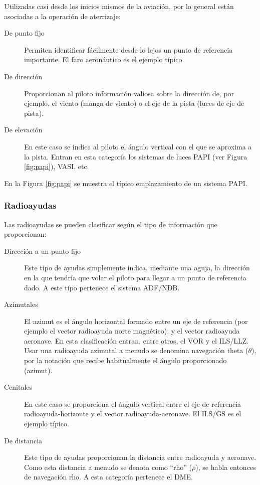 Utilizadas casi desde los inicios mismos de la aviaci\'on, por lo general est\'an asociadas a la operaci\'on de aterrizaje:
\begin{description}
\item [De punto fijo] Permiten identificar f\'acilmente desde lo lejos un punto de referencia importante. El faro aeron\'autico es el ejemplo t\'ipico.

    \item [De direcci\'on] Proporcionan al piloto informaci\'on valiosa sobre la direcci\'on de, por ejemplo, el viento (manga de viento) o el eje de la pista (luces de eje de pista).

    \item [De elevaci\'on] En este caso se indica al piloto el \'angulo vertical con el que se aproxima a la pista. Entran en esta categor\'ia los sistemas de luces PAPI (ver Figura \ref{fig:papi}), VASI, etc.

\end{description}
     

En la Figura \ref{fig:papi} se muestra el t\'ipico emplazamiento de un sistema PAPI. 



\subsubsection{Radioayudas}

Las radioayudas se pueden clasificar seg\'un el tipo de informaci\'on que proporcionan:

\begin{description}
\item [Direcci\'on a un punto fijo] Este tipo de ayudas simplemente indica, mediante una aguja, la direcci\'on en la que tendr\'ia que volar el piloto para llegar a un punto de referencia dado. A este tipo pertenece el sistema ADF/NDB.

    \item [Azimutales] El azimut es el \'angulo horizontal formado entre un eje de referencia (por ejemplo el vector radioayuda norte magn\'etico), y el vector radioayuda aeronave. En esta clasificaci\'on entran, entre otros, el VOR y el ILS/LLZ.
      Usar una radioayuda azimutal a menudo se de\-no\-mi\-na navegaci\'on theta ($\theta$), por la notaci\'on que recibe habitualmente el \'angulo proporcionado (azimut).

    \item [Cenitales] En este caso se proporciona el \'angulo vertical entre el eje de referencia radioayuda-horizonte y el vector radioayuda-aeronave. El ILS/GS es el ejemplo t\'ipico.

    \item [De distancia] Este tipo de ayudas proporcionan la distancia entre radioayuda y aeronave. Como esta distancia a menudo se denota como ``rho'' ($\rho$), se habla entonces de navegaci\'on rho. A esta categor\'ia pertenece el DME.

\end{description}
     
